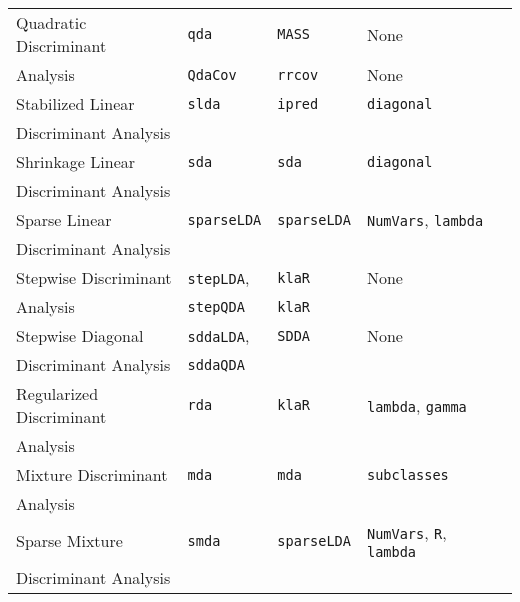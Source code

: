 \documentclass[12pt]{article}
\begin{document}
\begin{longtable}{lllll}
            
      Quadratic Discriminant  &
         \texttt{qda} & 
            \texttt{MASS}       &          
            None\\  
      \:\:  Analysis           &
         \texttt{QdaCov} & 
            \texttt{rrcov}       &          
            None\\            
            
      Stabilized Linear &
         \texttt{slda} & 
            \texttt{ipred}       &          
            \texttt{diagonal}\\  
      \:\: Discriminant Analysis & & &\\            
            
      Shrinkage Linear &
         \texttt{sda} & 
            \texttt{sda}       &          
            \texttt{diagonal}\\  
      \:\: Discriminant Analysis & & &\\
      
      Sparse Linear &
         \texttt{sparseLDA} & 
            \texttt{sparseLDA}       &          
            \texttt{NumVars}, \texttt{lambda} \\  
      \:\: Discriminant Analysis & & &\\      
      
       Stepwise Discriminant&
        \texttt{stepLDA}, &
        \texttt{klaR} &
        None \\
      \:\: Analysis & \texttt{stepQDA} & \texttt{klaR}  &\\     
      
      Stepwise Diagonal &
        \texttt{sddaLDA}, &
        \texttt{SDDA} &
        None \\
      \:\: Discriminant Analysis & \texttt{sddaQDA} & &\\
            
      Regularized Discriminant  &
         \texttt{rda} & 
            \texttt{klaR}       & 
            \texttt{lambda}, \texttt{gamma} & \\
      \: \: Analysis \\
      
      Mixture Discriminant  &
         \texttt{mda} & 
            \texttt{mda}       & 
            \texttt{subclasses} & \\
      \: \: Analysis \\      

      Sparse Mixture &
         \texttt{smda} & 
            \texttt{sparseLDA}       &          
            \texttt{NumVars}, \texttt{R}, \texttt{lambda} \\  
      \:\: Discriminant Analysis & & &\\    
      

\end{longtable}
\end{document}

